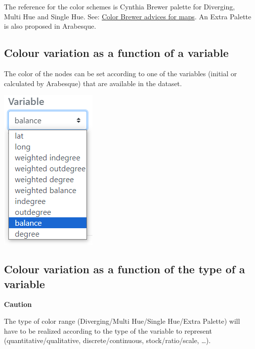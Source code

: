 \documentclass[
  letterpaper,
  DIV=11,
  numbers=noendperiod]{scrreprt}
\begin{document}
The reference for the color schemes is Cynthia Brewer palette for
Diverging, Multi Hue and Single Hue. See:
\href{https://colorbrewer2.org/\#type=sequential&scheme=BuGn&n=3}{Color
Brewer advices for maps}. An Extra Palette is also proposed in
Arabesque.

\subsection{Colour variation as a function of a
variable}\label{colour-variation-as-a-function-of-a-variable}

The color of the nodes can be set according to one of the variables
(initial or calculated by Arabesque) that are available in the dataset.

\includegraphics{images/geom_add_nodes_1_color_variable.png}

\subsection{Colour variation as a function of the type of a
variable}\label{colour-variation-as-a-function-of-the-type-of-a-variable}

\begin{tcolorbox}[enhanced jigsaw, rightrule=.15mm, bottomrule=.15mm, colback=white, breakable, opacityback=0, colframe=quarto-callout-caution-color-frame, toprule=.15mm, leftrule=.75mm, arc=.35mm, left=2mm]
\begin{minipage}[t]{5.5mm}
\textcolor{quarto-callout-caution-color}{\faFire}
\end{minipage}%
\begin{minipage}[t]{\textwidth - 5.5mm}

\vspace{-3mm}\textbf{Caution}\vspace{3mm}

The type of color range (Diverging/Multi Hue/Single Hue/Extra Palette)
will have to be realized according to the type of the variable to
represent (quantitative/qualitative, discrete/continuous,
stock/ratio/scale, \ldots).

\end{minipage}%
\end{tcolorbox}
\end{document}
